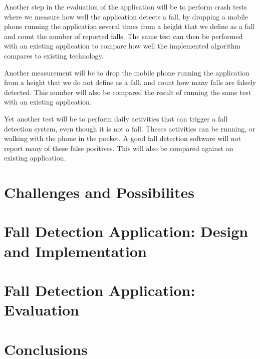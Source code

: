 \documentclass[12pt, a4paper, onecolumn]{article}
\begin{document}
	Another step in the evaluation of the application will be to perform crash tests where we measure how well the application detects a fall, by dropping a mobile phone running the application several times from a height that we define as a fall and count the number of reported falls. The same test can then be performed with an existing application to compare how well the implemented algorithm compares to existing technology.
	
	Another measurement will be to drop the mobile phone running the application from a height that we do not define as a fall, and count how many falls are falsely detected. This number will also be compared the result of running the same test with an existing application.
	
	Yet another test will be to perform daily activities that can trigger a fall detection system, even though it is not a fall. Theses activities can be running, or walking with the phone in the pocket. A good fall detection software will not report many of these false positives. This will also be compared against an existing application.
	
	\newpage
	
	\section{Challenges and Possibilites}
	\newpage
	
	\section{Fall Detection Application: Design and Implementation}
	\newpage
	
	\section{Fall Detection Application: Evaluation}
	\newpage
	
	\section{Conclusions}
	\newpage
		
	
	
\end{document}
